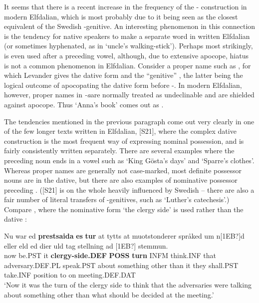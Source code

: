 
It seems that there is a recent increase in the frequency of the \nobreakdash- construction in modern Elfdalian, which is most probably due to it being seen as the closest equivalent of the Swedish -genitive. An interesting phenomenon in this connection is the tendency for native speakers to make  a separate word in written Elfdalian (or sometimes hyphenated, as in  ‘uncle’s walking-stick’). Perhaps most strikingly,  is even used after a preceding vowel, although, due to extensive apocope, hiatus is not a common phenomenon in Elfdalian. Consider a proper name such as , for which Levander gives the dative form  and the “genitive” , the latter being the logical outcome of apocopating the dative form before {}-. In modern Elfdalian, however, proper names in\textit{ {}-a}\textstyleLinguisticExample{ }are normally treated as undeclinable and are shielded against apocope. Thus ‘Anna’s book’ comes out as . 

The tendencies mentioned in the previous paragraph come out very clearly in one of the few longer texts written in Elfdalian, [S21], where the complex dative construction is the most frequent way of expressing nominal possession, and  is fairly consistently written separately. There are several examples where the preceding noun ends in a vowel such as  ‘King Gösta’s days’ and  ‘Sparre’s clothes’. Whereas proper names are generally not case-marked, most definite possessor nouns are in the dative, but there are also examples of nominative possessor preceding . ([S21] is on the whole heavily influenced by Swedish – there are also a fair number of literal transfers of -genitives, such as ‘Luther’s catechesis’.) Compare , where the nominative form  ‘the clergy side’ is used rather than the dative :

\ea\label{}
\gll Nu  war  ed  \textbf{prestsaida} \textbf{es} \textbf{tur} at  tytts at  muotstonderer  språked  um  n[1EB?]d  eller  eld  ed dier  uld  tag  stellning  ad  [1EB?]  stemmun.\\
now  be.PST  it  \textbf{clergy-side.DEF} \textbf{POSS} \textbf{turn} INFM  think.INF that  adversary.DEF.PL  speak.PST  about  something  other  than  it they  shall.PST  take.INF  position  to  on  meeting.DEF.DAT\\
\glt ‘Now it was the turn of the clergy side to think that the adversaries were talking about something other than what should be decided at the meeting.’ 
\z

